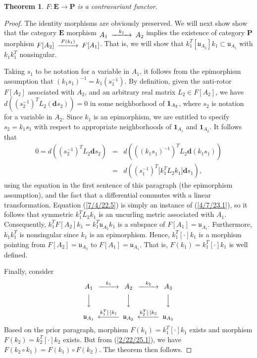 \documentclass{amsart}
\numberwithin{equation}{section}
\newtheorem{theorem}{Theorem}
\theoremstyle{definition}
\numberwithin{theorem}{section}
\begin{document}
\begin{theorem}\label{6/13/22.1}  $F: \mathbf{E}\rightarrow \mathbf{P}$ is a contravariant functor. 
 \end{theorem}
 \begin{proof}  The identity morphisms are obviously preserved.
We will next show show that the category $\mathbf{E}$ morphism $ \begin{CD}  A_1 @>k_1>> A_2\end{CD}$ implies the existence of category {\bf P} morphism $ \begin{CD}  F[A_2] @>F(k_1)>> F[A_1]\end{CD}$.  That is, we will show that $k_1^T[\mathfrak{u}_{A_2}]k_1 \subset \mathfrak{u}_{A_1}$ with $k_1k_1^T$ nonsingular.

 Taking $s_1$ to be notation for a variable in $A_1$, it follows from the epimorphism assumption that $(k_1s_1)^{-1} = k_1(s_1^{-1})$.  By definition, given the anti-rotor $F[A_2]$ associated with $A_2$, and an arbitrary real matrix  $L_2 \in F[A_2]$, we have $d\left((s_2^{-1})^TL_2 (\mathbf{d}s_2)\right) = 0$ in some neighborhood of ${\bf 1}_{A_2}$, where $s_2$ is notation for a variable in $A_2$.  Since $k_1$ is an epimorphism, we are entitled to specify $s_2=k_1 s_1$ with respect to appropriate neighborhoods of $\mathbf{1}_{A_1}$ and $\mathbf{1}_{A_2}$.   It follows that \begin{eqnarray}\nonumber 0 = d\left((s_2^{-1})^TL_2 \mathbf{d}s_2\right) &=&  d\left(((k_1s_1)^{-1})^TL_2 \mathbf{d}(k_1s_1)\right) \\  &=& d\left((s_1^{-1})^T \big[k_1^T L_2k_1\big]\mathbf{d}s_1\right), \label{7/4/22.5}  \end{eqnarray}   using the equation in the first sentence of this paragraph (the epimorphism assumption), and the fact that a differential commutes with a linear transformation.  Equation (\ref{7/4/22.5}) is simply an instance of (\ref{4/7/23.1}), so it follows that symmetric $k_1^T L_2k_1$ is an uncurling metric associated with $A_1$.  
 Consequently, $k_1^TF[A_2]k_1 = k_1^T\mathfrak{u}_{A_2}k_1$ is a subspace of $F[A_1] = \mathfrak{u}_{A_1}$.  Furthermore, $k_1k_1^T$ is nonsingular since $k_1$ is an epimorphism.  Hence, $k_1^T[\cdot]k_1$ is a morphism pointing from $F[A_2]= \mathfrak{u}_{A_2}$ to $F[A_1]=\mathfrak{u}_{A_1}$.  That is, $F(k_1)=k_1^T[\cdot]k_1$ is well defined.

Finally, consider
      \[  \begin{CD}  
A_1 @>k_1>> A_2 @>k_2>> A_3\\
 @VVV   @VVV  @VVV\\
\mathfrak{u}_{A_1}   @<k_1^T[\cdot]k_1<<  \mathfrak{u}_{A_2}  @<k_2^T[\cdot]k_2<<  \mathfrak{u}_{A_3} \\ 
 \end{CD} \]
Based on the prior paragraph, morphism $F(k_1) = k_1^T[\cdot]k_1$ exists and morphism $F(k_2) = k_2^T[\cdot]k_2$ exists.  But from  (\ref{2/22/25.1}), we have $ F(k_2\circ k_1) = F(k_1)\circ F(k_2)$.   The theorem then follows.
\end{proof}
\end{document}
